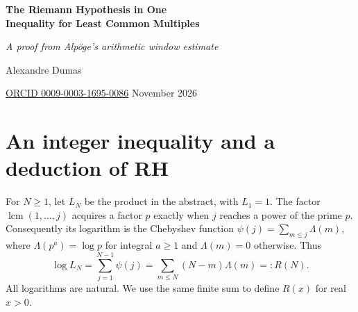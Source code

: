 \documentclass[11pt,a4paper]{article}
\newcommand{\lcm}{\operatorname{lcm}}
\begin{document}
\thispagestyle{plain}
\begin{center}
{\fontsize{22}{26}\selectfont\bfseries The Riemann Hypothesis in One\\[2pt] Inequality for Least Common Multiples\par}
\vspace{7pt}
{\large\itshape A proof from Alp\"oge's arithmetic window estimate\par}
\vspace{12pt}
{\large Alexandre Dumas\par}
\vspace{2pt}
{\small\href{https://orcid.org/0009-0003-1695-0086}{ORCID 0009-0003-1695-0086}\quad\textperiodcentered{} November 2026\par}
\end{center}
\begin{abstract}
Put $L_N=\prod_{j=1}^{N-1}\lcm(1,\ldots,j)$. We prove that the Riemann hypothesis is equivalent to $L_{n^2}^{\,4}\le 2^{n^3}L_{2n^2}$ for every positive integer $n$. The converse uses a Mellin transform that retains a pole at every nontrivial zeta zero. A second integer inequality uses only prime powers in $(n^2,8n^2)$. We also determine the exact growth of the positive and negative parts of the associated prime sums on every fixed power interval, even when the supremum of the real parts of the zeros is unattained. Applied to the centered von Mangoldt ramp, this growth law gives a short deduction of the Riemann hypothesis from the arithmetic window estimate in Alp\"oge's formal proof. The integer equivalence and the growth law are proved here from classical zeta theory.
\end{abstract}

\section{An integer inequality and a deduction of RH}
For $N\ge1$, let $L_N$ be the product in the abstract, with $L_1=1$. The factor $\lcm(1,\ldots,j)$ acquires a factor $p$ exactly when $j$ reaches a power of the prime $p$. Consequently its logarithm is the Chebyshev function $\psi(j)=\sum_{m\le j}\Lambda(m)$, where $\Lambda(p^a)=\log p$ for integral $a\ge1$ and $\Lambda(m)=0$ otherwise. Thus
\begin{equation}\label{eq:lcm}
 \log L_N=\sum_{j=1}^{N-1}\psi(j)=\sum_{m\le N}(N-m)\Lambda(m)=:R(N).
\end{equation}
All logarithms are natural. We use the same finite sum to define $R(x)$ for real $x>0$.
\end{document}
